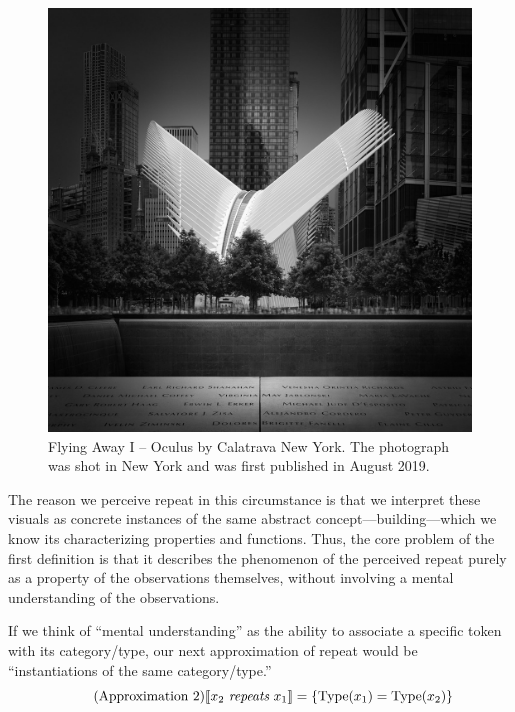 \begin{figure} 
    \centering 
    \includegraphics[width=0.5\linewidth]{Julia-Anna-Gospodarou_Flying-Away_-New-York-Oculus-Memorial-Pools_1200px.jpg}
    \caption{Flying Away I -- Oculus by Calatrava New York. The photograph was shot in New York and was first published in August 2019.}
    \label{fig: Oculus}
\end{figure}
The reason we perceive repeat in this circumstance is that we interpret these visuals as concrete instances of the same abstract concept---building---which we know its characterizing properties and functions. Thus, the core problem of the first definition is that it describes the phenomenon of the perceived repeat purely as a property of the observations themselves, without involving a mental understanding of the observations. 






If we think of ``mental understanding'' as the ability to associate a specific token with its category/type, our next approximation of repeat would be ``instantiations of the same category/type.'' 
\begin{equation} 
    \tag{Approximation 2}
    \llbracket x_2 \ \emph{repeats}\  x_1  \rrbracket = \left\{ \text{Type}(x_1) = \text{Type}(x_2)\right\}
\end{equation}

